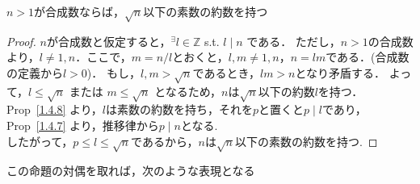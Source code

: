 



% 

    \begin{prop} \label{1.4.9}
      $n>1$が合成数ならば，$\sqrt{n}$以下の素数の約数を持つ
    \end{prop}

    \begin{proof}
      $n$が合成数と仮定すると，$^{\exists}l \in \mathbb{Z}$ s.t. $l \mid n$ である．
      ただし，$n>1$の合成数より，$ l \neq 1, n$．ここで，$m=n/l$とおくと，$l,m \neq 1,n$，$n = lm$である．(合成数の定義から$l>0$)．
      もし，$l,m > \sqrt{n}$であるとき，$lm > n$となり矛盾する．
      よって，$l \leq \sqrt{n}$ または $m \leq \sqrt{n}$ となるため，$n$は$\sqrt{n}$以下の約数$l$を持つ． \\
      Prop~\ref{1.4.8} より，$l$は素数の約数を持ち，それを$p$と置くと$ p \mid l$であり，Prop~\ref{1.4.7} より，推移律から$p \mid n$となる. \\
      したがって，$p \leq l \leq \sqrt{n}$であるから，$n$は$\sqrt{n}$以下の素数の約数を持つ.
    \end{proof}

    この命題の対偶を取れば，次のような表現となる

